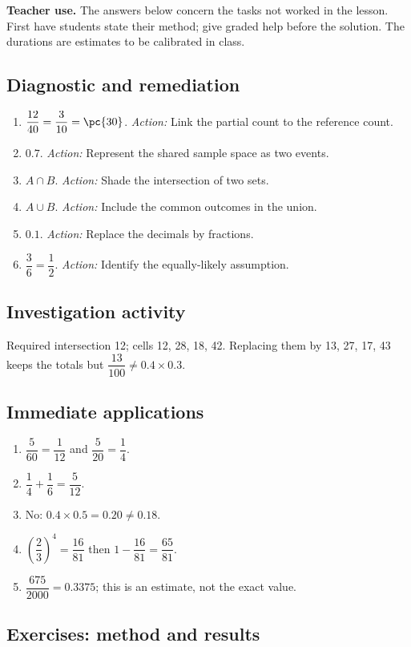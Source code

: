 \label{C05-CORR}
\textbf{Teacher use.} The answers below concern the tasks not worked in the lesson. First have students state their method; give graded help before the solution. The durations are estimates to be calibrated in class.
\subsection*{Diagnostic and remediation}
\begin{enumerate}
\item $\dfrac{12}{40}=\dfrac{3}{10}=\pc{30}$. \textit{Action:} Link the partial count to the reference count.
\item $\num{0,7}$. \textit{Action:} Represent the shared sample space as two events.
\item $A\cap B$. \textit{Action:} Shade the intersection of two sets.
\item $A\cup B$. \textit{Action:} Include the common outcomes in the union.
\item $\num{0,1}$. \textit{Action:} Replace the decimals by fractions.
\item $\dfrac{3}{6}=\dfrac{1}{2}$. \textit{Action:} Identify the equally-likely assumption.
\end{enumerate}
\subsection*{Investigation activity}
Required intersection 12; cells 12, 28, 18, 42. Replacing them by 13, 27, 17, 43 keeps the totals but $\dfrac{13}{100}\ne \num{0,4}\times \num{0,3}$.
\subsection*{Immediate applications}
\begin{enumerate}
\item $\dfrac{5}{60}=\dfrac{1}{12}$ and $\dfrac{5}{20}=\dfrac{1}{4}$.
\item $\dfrac{1}{4}+\dfrac{1}{6}=\dfrac{5}{12}$.
\item No: $\num{0,4}\times\num{0,5}=\num{0,20}\ne\num{0,18}$.
\item $(\dfrac{2}{3})^4=\dfrac{16}{81}$ then $1-\dfrac{16}{81}=\dfrac{65}{81}$.
\item $\dfrac{675}{2000}=\num{0,3375}$; this is an estimate, not the exact value.
\end{enumerate}
\subsection*{Exercises: method and results}
